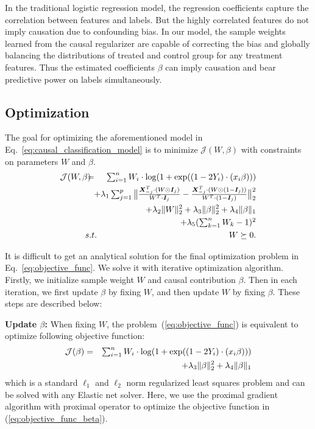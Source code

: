 \documentclass[sigconf]{acmart}
\newcommand*{\Scale}[2][4]{\scalebox{#1}{$#2$}}
\begin{document}
In the traditional logistic regression model, the regression coefficients capture the correlation between features and labels. 
But the highly correlated features do not imply causation due to confounding bias.  
In our model, the sample weights learned from the causal regularizer are capable of correcting the bias and globally balancing the distributions of treated and control group for any treatment features. 
Thus the estimated coefficients $\beta$ can imply causation and bear predictive power on labels simultaneously.

\subsection{Optimization}
The goal for optimizing the aforementioned model in Eq.~\ref{eq:causal_classification_model} is to minimize $\mathcal{J}(W, \beta)$ with constraints on parameters $W$ and $\beta$.
\begin{eqnarray}
\label{eq:objective_func}
\mathcal{J}(W, \beta)\!\!\!\! &=& \!\!\!\! \Scale[1.0]{\sum_{i=1}^{n}W_i\cdot \log(1+\exp((1-2Y_i)\cdot (x_i\beta)))} \\
\nonumber&& \!\!\!\!\!\!\!\! + \Scale[1.0]{\lambda_1 \sum_{j=1}^{p} \big\|\frac{\bm{X}_{-j}^{T}\cdot(W\odot \bm{I}_j)}{W^{T}\cdot \bm{I}_j}-\frac{\bm{X}_{-j}^{T}\cdot(W\odot (1-\bm{I}_j))}{W^{T}\cdot (1-\bm{I}_j)}\big\|_2^2}\\
\nonumber&& \!\!\!\!\!\!\!\! + \lambda_2 \|W\|_2^2 + \lambda_3\|\beta\|_2^2 + \lambda_4\|\beta\|_1 \\
\nonumber&& \!\!\!\!\!\!\!\! + \Scale[1.0]{\lambda_5 (\sum_{k=1}^{n}W_k-1)^{2}} \\
\nonumber &s.t.& W\succeq 0.
\end{eqnarray}

It is difficult to get an analytical solution for the final optimization problem in Eq.~\ref{eq:objective_func}.
We solve it with iterative optimization algorithm.
Firstly, we initialize sample weight $W$ and causal contribution $\beta$.
Then in each iteration, we first update $\beta$ by fixing $W$, and then update $W$ by fixing $\beta$.
These steps are described below:

\par\noindent\textbf{Update $\beta$:} When fixing $W$, the problem~(\ref{eq:objective_func}) is equivalent to optimize following objective function:
\begin{eqnarray}
\label{eq:objective_func_beta}
\mathcal{J}(\beta) &=& \Scale[1.0]{\sum_{i=1}^{n}W_i\cdot \log(1+\exp((1-2Y_i)\cdot (x_i\beta)))} \\
\nonumber&& + \lambda_3\|\beta\|_2^2 + \lambda_4\|\beta\|_1
\end{eqnarray}
which is a standard $\ell_1$ and $\ell_2$ norm regularized least squares problem and can be solved with any Elastic net solver.
Here, we use the proximal gradient algorithm \cite{parikh2014proximal} with proximal operator to optimize the objective function in (\ref{eq:objective_func_beta}).
\end{document}
